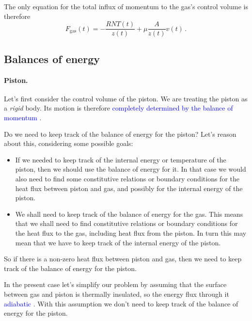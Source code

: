 \documentclass[a4paper,12pt,%
onecolumn,oneside,%
british%
]{memoir}
\renewcommand*{\|}[1][]{\nonscript\:#1\vert\nonscript\:\mathopen{}}
\newcommand*{\sect}{\S}%
\renewcommand*{\autoref}[3][\sect\,\ref]{\textcolor{blue}{#3}
\raisebox{0.6ex}{\color{blue}\miniscule%
\faIcon{angle-right}%
\;#1{#2}\;p.\,\pageref{#2}}}
\newcommand*{\yvis}{\mu} %
\newcommand*{\yN}{N}
\newcommand*{\yFgas}{F_{\textrm{gas}}}
\newcommand*{\yT}{T}%
\begin{document}
\medskip

The only equation for the total influx of momentum to the gas's control volume is therefore
\begin{equation}
  \label{eq:gas_top_F}
      \yFgas(t) = -\frac{R \yN \yT(t)}{z(t)}  + \yvis \frac{A}{z(t)} v(t) \,.
\end{equation}

\subsection{Balances of energy}
\label{sec:idealgas_ex_energy}

\paragraph{Piston.} Let's first consider the control volume of the piston. We are treating the piston as a \emph{rigid} body. Its motion is therefore \autoref{sec:rigid_bodies}{completely determined by the balance of momentum}.

Do we need to keep track of the balance of energy for the piston? Let's reason about this, considering some possible goals:
\begin{itemize}[noitemsep]
\item If we needed to keep track of the internal energy or temperature of the piston, then we should use the balance of energy for it. In that case we would also need to find some constitutive relations or boundary conditions for the heat flux between piston and gas, and possibly for the internal energy of the piston.
\item We shall need to keep track of the balance of energy for the gas. This means that we shall need to find constitutive relations or boundary conditions for the heat flux to the gas, including heat flux from the piston. In turn this may mean that we have to keep track of the internal energy of the piston.
\end{itemize}
So if there is a non-zero heat flux between piston and gas, then we need to keep track of the balance of energy for the piston.

In the present case let's simplify our problem by assuming that the surface between gas and piston is thermally insulated, so the energy flux through it \autoref{def:heatflux_mechpower}{adiabatic}. With this assumption we don't need to keep track of the balance of energy for the piston.
\end{document}
